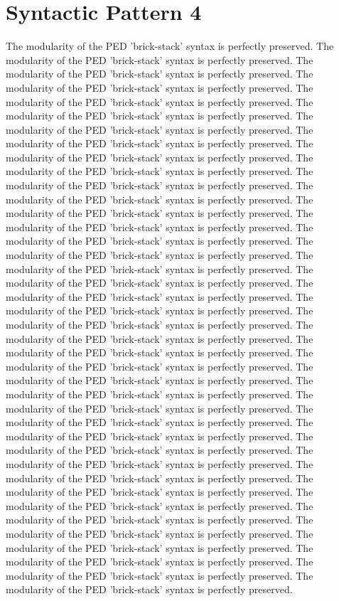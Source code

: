 \section{Syntactic Pattern 4}
The modularity of the PED 'brick-stack' syntax is perfectly preserved. The modularity of the PED 'brick-stack' syntax is perfectly preserved. The modularity of the PED 'brick-stack' syntax is perfectly preserved. The modularity of the PED 'brick-stack' syntax is perfectly preserved. The modularity of the PED 'brick-stack' syntax is perfectly preserved. The modularity of the PED 'brick-stack' syntax is perfectly preserved. The modularity of the PED 'brick-stack' syntax is perfectly preserved. The modularity of the PED 'brick-stack' syntax is perfectly preserved. The modularity of the PED 'brick-stack' syntax is perfectly preserved. The modularity of the PED 'brick-stack' syntax is perfectly preserved. The modularity of the PED 'brick-stack' syntax is perfectly preserved. The modularity of the PED 'brick-stack' syntax is perfectly preserved. The modularity of the PED 'brick-stack' syntax is perfectly preserved. The modularity of the PED 'brick-stack' syntax is perfectly preserved. The modularity of the PED 'brick-stack' syntax is perfectly preserved. The modularity of the PED 'brick-stack' syntax is perfectly preserved. The modularity of the PED 'brick-stack' syntax is perfectly preserved. The modularity of the PED 'brick-stack' syntax is perfectly preserved. The modularity of the PED 'brick-stack' syntax is perfectly preserved. The modularity of the PED 'brick-stack' syntax is perfectly preserved. The modularity of the PED 'brick-stack' syntax is perfectly preserved. The modularity of the PED 'brick-stack' syntax is perfectly preserved. The modularity of the PED 'brick-stack' syntax is perfectly preserved. The modularity of the PED 'brick-stack' syntax is perfectly preserved. The modularity of the PED 'brick-stack' syntax is perfectly preserved. The modularity of the PED 'brick-stack' syntax is perfectly preserved. The modularity of the PED 'brick-stack' syntax is perfectly preserved. The modularity of the PED 'brick-stack' syntax is perfectly preserved. The modularity of the PED 'brick-stack' syntax is perfectly preserved. The modularity of the PED 'brick-stack' syntax is perfectly preserved. The modularity of the PED 'brick-stack' syntax is perfectly preserved. The modularity of the PED 'brick-stack' syntax is perfectly preserved. The modularity of the PED 'brick-stack' syntax is perfectly preserved. The modularity of the PED 'brick-stack' syntax is perfectly preserved. The modularity of the PED 'brick-stack' syntax is perfectly preserved. The modularity of the PED 'brick-stack' syntax is perfectly preserved. The modularity of the PED 'brick-stack' syntax is perfectly preserved. The modularity of the PED 'brick-stack' syntax is perfectly preserved. The modularity of the PED 'brick-stack' syntax is perfectly preserved. The modularity of the PED 'brick-stack' syntax is perfectly preserved. 

